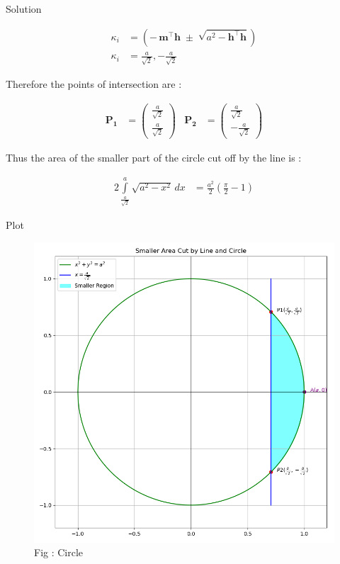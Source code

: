 \documentclass{beamer}
\numberwithin{equation}{section}
\theoremstyle{remark}
\newcommand{\myvec}[1]{\ensuremath{\begin{pmatrix}#1\end{pmatrix}}}
\let\vec\mathbf
\begin{document}
\begin{frame}{Solution}

\begin{align}
\kappa_i &=\left(
       -\,\vec{m}^\top\vec{h}
       \;\pm\;
       \sqrt{a^2 -\vec{h}^\top\vec{h}}
     \right)\\
  \kappa_i &= \frac{a}{\sqrt{2}},-\frac{a}{\sqrt{2}}
\end{align}

Therefore the points of intersection are :

\begin{align}
  \vec{P_1} &= \myvec{\tfrac{a}{\sqrt{2}}\\\tfrac{a}{\sqrt{2}}} & \vec{P_2} &= \myvec{\tfrac{a}{\sqrt{2}}\\-\tfrac{a}{\sqrt{2}}}
\end{align}

Thus the area of the smaller part of the circle cut off by the line is :

\begin{align}
  2 \int\limits_{\frac{a}{\sqrt{2}}}^{a}\! \sqrt{a^2 - x^2}\, dx &= \frac{a^2}{2}\left(\frac{\pi}{2} - 1\right)
\end{align}

\end{frame}

\begin{frame}{Plot}

\begin{figure}[h!]
  \centering
  \includegraphics[width=0.6\columnwidth]{figs/circle_area.png} 
   \caption*{Fig : Circle}
  \label{Fig1}
\end{figure}

\end{frame}
\end{document}
